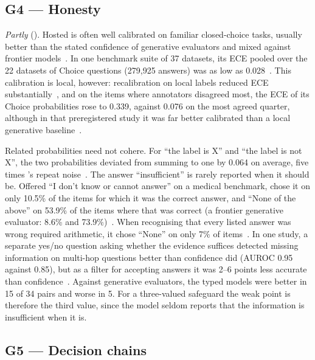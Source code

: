 \subsection{G4 --- Honesty}
\label{sec:g4}

\emph{Partly} (\nTallyFour{}).
Hosted \jev{} is often well calibrated on familiar closed-choice tasks, usually better than the stated confidence of generative evaluators and mixed against frontier models~\cite{arx24574,arx34024}.
In one benchmark suite of 37 datasets, its ECE pooled over the 22 datasets of Choice questions (279{,}925 answers) was as low as 0.028~\cite{arx37647}.
This calibration is local, however: recalibration on local labels reduced ECE substantially~\cite{arx24052,arx27607}, and on the items where annotators disagreed most, the ECE of its Choice probabilities rose to 0.339, against 0.076 on the most agreed quarter, although in that preregistered study it was far better calibrated than a local generative baseline~\cite{zen23032384}\zmark{}.

Related probabilities need not cohere.
For ``the label is X'' and ``the label is not X'', the two probabilities deviated from summing to one by 0.064 on average, five times \jev{}'s repeat noise~\cite{arx33209}.
The answer ``insufficient'' is rarely reported when it should be.
Offered ``I don't know or cannot answer'' on a medical benchmark, \jev{} chose it on only 10.5\% of the items for which it was the correct answer, and ``None of the above'' on 53.9\% of the items where that was correct (a frontier generative evaluator: 8.6\% and 73.9\%)~\cite{arx34024}.
When recognising that every listed answer was wrong required arithmetic, it chose ``None'' on only 7\% of items~\cite{arx39496}.
In one study, a separate yes/no question asking whether the evidence suffices detected missing information on multi-hop questions better than confidence did (AUROC 0.95 against 0.85), but as a filter for accepting answers it was 2--6 points less accurate than confidence~\cite{arx01006}.
Against generative evaluators, the typed models were better in 15 of 34 pairs and worse in 5.
For a three-valued safeguard the weak point is therefore the third value, since the model seldom reports that the information is insufficient when it is.


\subsection{G5 --- Decision chains}
\label{sec:g5}

